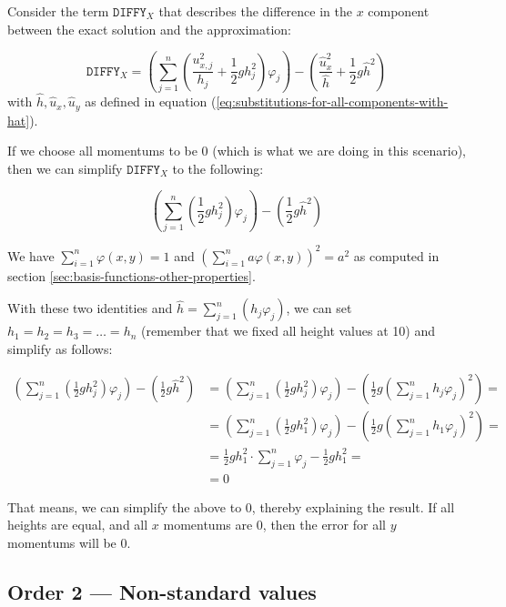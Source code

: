 \documentclass[a4paper, twoside]{article}
\renewcommand{\phi}{\varphi}
\begin{document}
Consider the term $\mathtt{DIFFY}_X$ that describes the difference in the $x$ component between the exact solution and the approximation:

\begin{equation*}
  \mathtt{DIFFY}_X = \left( \sum_{j=1}^n \left(\frac{u_{x,j}^2}{h_j} + \frac{1}{2} g h_j^2\right) \phi_j \right) - \left( \frac{\widehat{u}_x^2}{\widehat h} + \frac{1}{2} g \widehat{h}^2\right)
\end{equation*}
with $\widehat h, \widehat{u}_x, \widehat{u}_y$ as defined in equation (\ref{eq:substitutions-for-all-components-with-hat}).

If we choose all momentums to be 0 (which is what we are doing in this scenario), then we can simplify $\mathtt{DIFFY}_X$ to the following:

\begin{equation*}
  \left( \sum_{j=1}^n \left(\frac{1}{2} g h_j^2\right) \phi_j \right) - \left( \frac{1}{2} g \widehat{h}^2\right)
\end{equation*}

We have $\sum_{i=1}^n \phi(x,y)=1$ and  $(\sum_{i=1}^n a \phi(x,y))^2 = a^2$ as computed in section \ref{sec:basis-functions-other-properties}.

With these two identities and $\widehat{h}=\sum_{j=1}^n \left(h_j \phi_j\right)$, we can set $h_1=h_2=h_3=\dots=h_n$ (remember that we fixed all height values at 10) and simplify as follows:

\begin{align*}
  \left( \sum_{j=1}^n \left(\frac{1}{2} g h_j^2\right) \phi_j \right) - \left( \frac{1}{2} g \widehat{h}^2\right) &= \left( \sum_{j=1}^n \left(\frac{1}{2} g h_j^2\right) \phi_j \right) - \left( \frac{1}{2} g \left( \sum_{j=1}^n h_j\phi_j \right)^2\right) = \\
  &= \left( \sum_{j=1}^n \left(\frac{1}{2} g h_1^2\right) \phi_j \right) - \left( \frac{1}{2} g \left( \sum_{j=1}^n h_1\phi_j \right)^2\right) = \\
  &= \frac{1}{2} g h_1^2 \cdot \sum_{j=1}^n \phi_j - \frac{1}{2} g h_1^2 = \\
  &= 0
\end{align*}

That means, we can simplify the above to 0, thereby explaining the result. If all heights are equal, and all $x$ momentums are 0, then the error for all $y$ momentums will be 0.

\subsection{Order 2 --- Non-standard values}
\label{sec:stiffness-analysis-ord2-nondefault}
\end{document}
